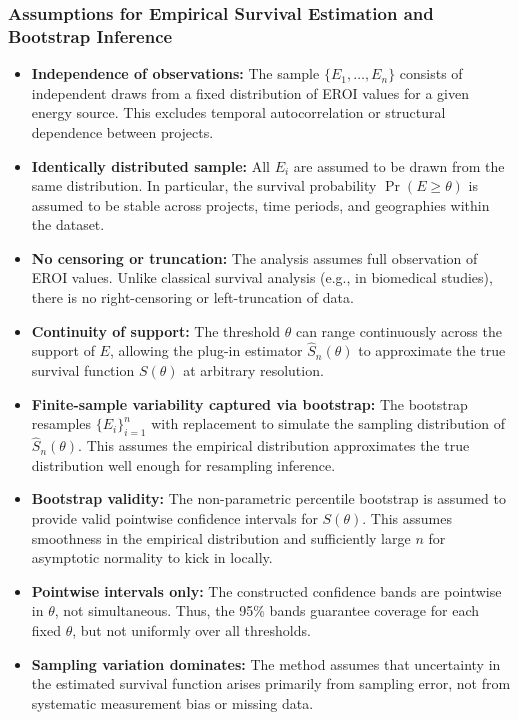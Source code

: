 \documentclass[a4paper,12pt]{article}
\begin{document}
\subsubsection*{Assumptions for Empirical Survival Estimation and Bootstrap Inference}
\begin{itemize}
    \item \textbf{Independence of observations:} The sample $\{E_1, \dots, E_n\}$ consists of independent draws from a fixed distribution of EROI values for a given energy source. This excludes temporal autocorrelation or structural dependence between projects.

    \item \textbf{Identically distributed sample:} All $E_i$ are assumed to be drawn from the same distribution. In particular, the survival probability $\Pr(E \ge \theta)$ is assumed to be stable across projects, time periods, and geographies within the dataset.

    \item \textbf{No censoring or truncation:} The analysis assumes full observation of EROI values. Unlike classical survival analysis (e.g., in biomedical studies), there is no right-censoring or left-truncation of data.

    \item \textbf{Continuity of support:} The threshold $\theta$ can range continuously across the support of $E$, allowing the plug-in estimator $\widehat{S}_n(\theta)$ to approximate the true survival function $S(\theta)$ at arbitrary resolution.

    \item \textbf{Finite-sample variability captured via bootstrap:} The bootstrap resamples $\{E_i\}_{i=1}^n$ with replacement to simulate the sampling distribution of $\widehat{S}_n(\theta)$. This assumes the empirical distribution approximates the true distribution well enough for resampling inference.

    \item \textbf{Bootstrap validity:} The non-parametric percentile bootstrap is assumed to provide valid pointwise confidence intervals for $S(\theta)$. This assumes smoothness in the empirical distribution and sufficiently large $n$ for asymptotic normality to kick in locally.

    \item \textbf{Pointwise intervals only:} The constructed confidence bands are pointwise in $\theta$, not simultaneous. Thus, the 95\% bands guarantee coverage for each fixed $\theta$, but not uniformly over all thresholds.

    \item \textbf{Sampling variation dominates:} The method assumes that uncertainty in the estimated survival function arises primarily from sampling error, not from systematic measurement bias or missing data.
\end{itemize}
\end{document}
